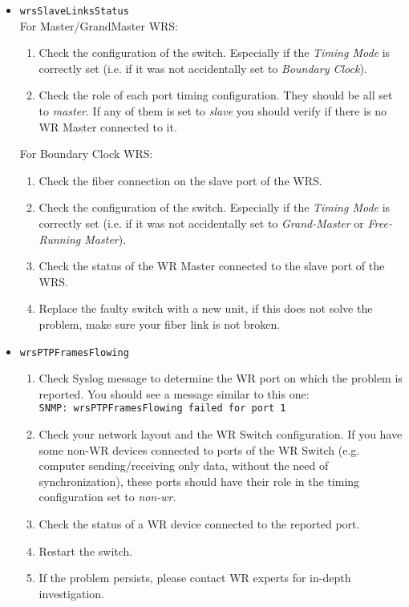 \begin{itemize}
  \item \texttt{wrsSlaveLinksStatus}\\
    For Master/GrandMaster WRS:
    \begin{enumerate}
      \item Check the configuration of the switch. Especially if the
        \emph{Timing Mode} is correctly set (i.e. if it was not accidentally set
        to \emph{Boundary Clock}).
      \item Check the role of each port timing configuration. They should be all
        set to \emph{master}. If any of them is set to \emph{slave} you should
        verify if there is no WR Master connected to it.
    \end{enumerate}

    For Boundary Clock WRS:
    \begin{enumerate}
      \item Check the fiber connection on the slave port of the WRS.
      \item Check the configuration of the switch. Especially if the
        \emph{Timing Mode} is correctly set (i.e. if it was not accidentally set
        to \emph{Grand-Master} or \emph{Free-Running Master}).
      \item Check the status of the WR Master connected to the slave port of the
        WRS.
      \item Replace the faulty switch with a new unit, if this does not solve
        the problem, make sure your fiber link is not broken.
    \end{enumerate}

  \item \texttt{wrsPTPFramesFlowing}
    \begin{enumerate}
      \item Check Syslog message to determine the WR port on which the
        problem is reported. You should see a message similar to this one:\\
        \texttt{SNMP: wrsPTPFramesFlowing failed for port 1}
      \item Check your network layout and the WR Switch configuration. If you
        have some non-WR devices connected to ports of the WR Switch (e.g.
        computer sending/receiving only data, without the need of
        synchronization), these ports should have their role in the timing
        configuration set to \emph{non-wr}.
      \item Check the status of a WR device connected to the reported port.
      \item Restart the switch.
      \item If the problem persists, please contact WR experts for in-depth
        investigation.
    \end{enumerate}
\end{itemize}

